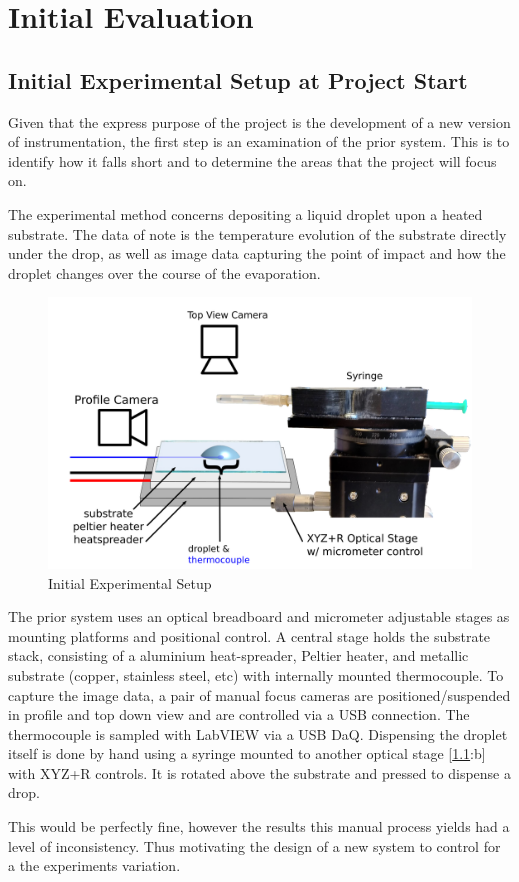 \chapter{Initial Evaluation}\label{C:init_eval}

\section{Initial Experimental Setup at Project Start}
Given that the express purpose of the project is the development of a new version of instrumentation, the first step is an examination of the prior system. This is to identify how it falls short and to determine the areas that the project will focus on.

The experimental method concerns depositing a liquid droplet upon a heated substrate. The data of note is the temperature evolution of the substrate directly under the drop, as well as image data capturing the point of impact and how the droplet changes over the course of the evaporation.

\begin{figure}[h]
    \begin{center}
        \includegraphics[width=.4\textwidth]{img/init_syr.png}
        \caption{Initial Experimental Setup}
        \label{fig:prior_exp}
    \end{center}
\end{figure}
The prior system uses an optical breadboard and micrometer adjustable stages as mounting platforms and positional control.
A central stage holds the substrate stack, consisting of a aluminium heat-spreader, Peltier heater, and metallic substrate (copper, stainless steel, etc) with internally mounted thermocouple.
To capture the image data, a pair of manual focus cameras are positioned/suspended in profile and top down view and are controlled via a USB connection. The thermocouple is sampled with LabVIEW via a USB DaQ.
Dispensing the droplet itself is done by hand using a syringe mounted to another optical stage [\ref{fig:prior_exp}:b] with XYZ+R controls. It is rotated above the substrate and pressed to dispense a drop.

This would be perfectly fine, however the results this manual process yields had a level of inconsistency. Thus motivating the design of a new system to control for a the experiments variation.

